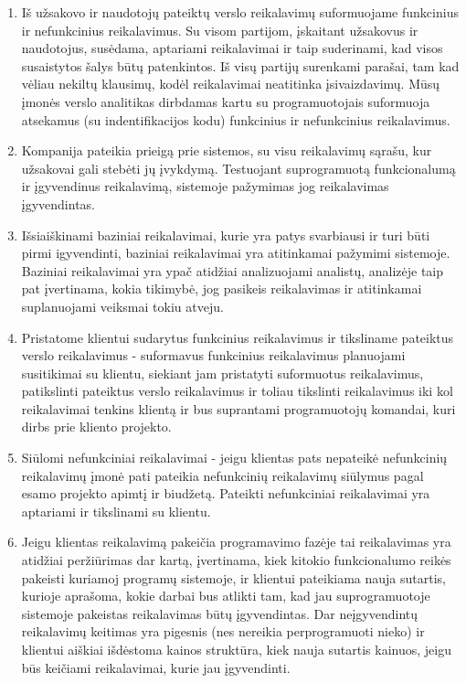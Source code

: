 \documentclass{VUMIFPSkursinis}
\begin{document}
\begin{enumerate}
	\item{
		Iš užsakovo ir naudotojų pateiktų verslo reikalavimų suformuojame funkcinius ir nefunkcinius reikalavimus.
		Su visom partijom, įskaitant užsakovus ir naudotojus, susėdama, aptariami reikalavimai ir taip suderinami, kad visos susaistytos šalys būtų patenkintos.
		Iš visų partijų surenkami parašai, tam kad vėliau nekiltų klausimų, kodėl reikalavimai neatitinka įsivaizdavimų.
		Mūsų įmonės verslo analitikas dirbdamas kartu su programuotojais suformuoja atsekamus (su indentifikacijos kodu) funkcinius ir nefunkcinius reikalavimus.
	}
	\item{
		Kompanija pateikia prieigą prie sistemos, su visu reikalavimų sąrašu, kur užsakovai gali stebėti jų įvykdymą.
		Testuojant suprogramuotą funkcionalumą ir įgyvendinus reikalavimą, sistemoje pažymimas jog reikalavimas įgyvendintas.
	}
	\item{
		Išsiaiškinami baziniai reikalavimai, kurie yra patys svarbiausi ir turi būti pirmi igyvendinti, baziniai reikalavimai yra atitinkamai pažymimi sistemoje.
		Baziniai reikalavimai yra ypač atidžiai analizuojami analistų, analizėje taip pat įvertinama, kokia tikimybė, jog pasikeis reikalavimas ir atitinkamai suplanuojami veiksmai tokiu atveju.
	}
	\item{
		Pristatome klientui sudarytus funkcinius reikalavimus ir tiksliname pateiktus verslo reikalavimus - suformavus funkcinius reikalavimus planuojami susitikimai su klientu, siekiant jam pristatyti suformuotus reikalavimus, patikslinti pateiktus verslo reikalavimus ir toliau tikslinti reikalavimus iki kol reikalavimai tenkins klientą ir bus suprantami programuotojų komandai, kuri dirbs prie kliento projekto.
	}
	\item{
		Siūlomi nefunkciniai reikalavimai - jeigu klientas pats nepateikė nefunkcinių reikalavimų įmonė pati pateikia nefunkcinių reikalavimų siūlymus pagal esamo projekto apimtį ir biudžetą.
		Pateikti nefunkciniai reikalavimai yra aptariami ir tikslinami su klientu.
	}
	\item{
		Jeigu klientas reikalavimą pakeičia programavimo fazėje tai reikalavimas yra atidžiai peržiūrimas dar kartą, įvertinama, kiek kitokio funkcionalumo reikės pakeisti kuriamoj programų sistemoje, ir klientui pateikiama nauja sutartis, kurioje aprašoma, kokie darbai bus atlikti tam, kad jau suprogramuotoje sistemoje pakeistas reikalavimas būtų įgyvendintas.
		Dar neįgyvendintų reikalavimų keitimas yra pigesnis (nes nereikia perprogramuoti nieko) ir klientui aiškiai išdėstoma kainos struktūra, kiek nauja sutartis kainuos, jeigu būs keičiami reikalavimai, kurie jau įgyvendinti.
	}
\end{enumerate}
\end{document}
